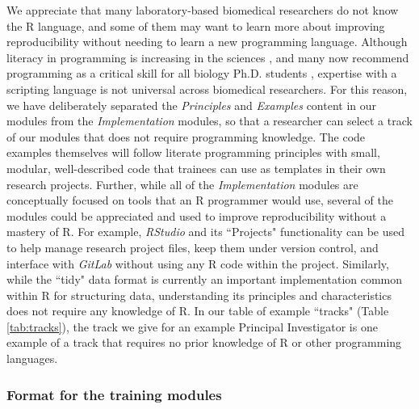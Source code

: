 \documentclass[pdftex,english,11.5pt,parskip=half]{scrartcl}
\begin{document}
We appreciate that many laboratory-based biomedical researchers do not know the R language, and
some of them may want to learn more about improving reproducibility without
needing to learn a new programming language. 
Although literacy in programming is increasing in the sciences
\cite{ram2013git}, and many now recommend programming as a critical skill for
all biology Ph.D. students \cite{list2017ten}, expertise
with a scripting language is not universal across biomedical researchers. For this reason, we have
deliberately separated the \textit{Principles} and \textit{Examples} content in our modules
from the \textit{Implementation} modules, so that a researcher can select a track of
our modules that does not require programming knowledge. The code examples themselves will follow literate programming principles with small, modular, well-described code that trainees can use as templates in their own research projects. Further, while all of
the \textit{Implementation} modules are conceptually focused on tools that an R
programmer would use, several of the modules could be appreciated and used to
improve reproducibility without a mastery of R. For example, \textit{RStudio} and its
``Projects" functionality can be used to help manage research project files,
keep them under version control, and interface with \textit{GitLab} without using any R code within the project. Similarly, while
the ``tidy" data format is currently an important implementation common within R
for structuring data, understanding its principles and characteristics does not
require any knowledge of R. In our table of example ``tracks" (Table \ref*{tab:tracks}), the track we give for an example Principal Investigator is one example
of a track that requires no prior knowledge of R or other programming
languages.   







\subsubsection*{Format for the training modules}
\end{document}

